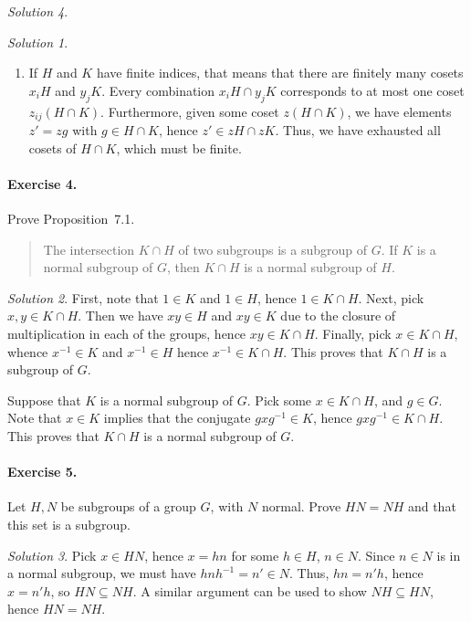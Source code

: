 \documentclass[11pt]{report}
\theoremstyle{remark}
\newtheorem*{solution}{Solution}
\begin{document}
\begin{solution}
\begin{solution}
\begin{enumerate}
        \item If $H$ and $K$ have finite indices, that means that there are finitely
        many cosets $x_iH$ and $y_jK$. Every combination $x_iH \cap y_jK$
        corresponds to at most one coset $z_{ij}(H \cap K)$.
        Furthermore, given some coset $z(H \cap K)$, we have elements $z' = zg$ with
        $g \in H \cap K$, hence $z' \in zH \cap zK$. Thus, we have exhausted all
        cosets of $H \cap K$, which must be finite.
    \end{enumerate} 
    \end{solution}
    
    \paragraph{Exercise 4.} Prove Proposition~7.1.
    \begin{quote}
        The intersection $K \cap H$ of two subgroups is a subgroup of $G$. If $K$ is
        a normal subgroup of $G$, then $K \cap H$ is a normal subgroup of $H$.
    \end{quote}
    \begin{solution}
        First, note that $1 \in K$ and $1 \in H$, hence $1 \in K \cap H$. Next, pick
        $x, y \in K \cap H$. Then we have $xy \in H$ and $xy \in K$ due to the
        closure of multiplication in each of the groups, hence $xy \in K \cap H$.
        Finally, pick $x \in K \cap H$, whence $x^{-1} \in K$ and $x^{-1} \in H$
        hence $x^{-1} \in K \cap H$. This proves that $K \cap H$ is a subgroup of
        $G$.

        Suppose that $K$ is a normal subgroup of $G$. Pick some $x \in K \cap H$,
        and $g \in G$. Note that $x \in K$ implies that the conjugate $gxg^{-1} \in
        K$, hence $gxg^{-1} \in K \cap H$. This proves that $K \cap H$ is a normal
        subgroup of $G$.
    \end{solution}

    \paragraph{Exercise 5.} Let $H, N$ be subgroups of a group $G$, with $N$ normal.
    Prove $HN = NH$ and that this set is a subgroup.
    \begin{solution}
        Pick $x \in HN$, hence $x = hn$ for some $h \in H$, $n \in N$. Since $n \in
        N$ is in a normal subgroup, we must have $hnh^{-1} = n' \in N$. Thus, $hn =
        n'h$, hence $x = n'h$, so $HN \subseteq NH$. A similar argument can be used
        to show $NH \subseteq HN$, hence $HN = NH$.


\end{solution}
\end{solution}
\end{document}
